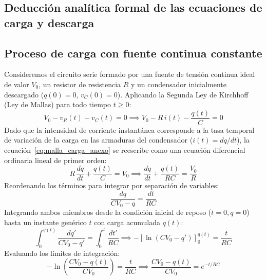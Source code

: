 
\begin{appendices}

\section{Deducción analítica formal de las ecuaciones de carga y descarga}
\label{sec:anexo_deducciones}

\subsection{Proceso de carga con fuente continua constante}

Consideremos el circuito serie formado por una fuente de tensión continua ideal de valor $V_0$, un resistor de resistencia $R$ y un condensador inicialmente descargado ($q(0) = 0$, $v_C(0) = 0$). Aplicando la Segunda Ley de Kirchhoff (Ley de Mallas) para todo tiempo $t \ge 0$:
\begin{equation}
    V_0 - v_R(t) - v_C(t) = 0 \implies V_0 - R\,i(t) - \frac{q(t)}{C} = 0
    \label{eq:malla_carga_anexo}
\end{equation}
Dado que la intensidad de corriente instantánea corresponde a la tasa temporal de variación de la carga en las armaduras del condensador ($i(t) = dq/dt$), la ecuación~\eqref{eq:malla_carga_anexo} se reescribe como una ecuación diferencial ordinaria lineal de primer orden:
\begin{equation}
    R\,\frac{dq}{dt} + \frac{q(t)}{C} = V_0 \implies \frac{dq}{dt} + \frac{q(t)}{RC} = \frac{V_0}{R}
\end{equation}
Reordenando los términos para integrar por separación de variables:
\begin{equation}
    \frac{dq}{C V_0 - q} = \frac{dt}{RC}
\end{equation}
Integrando ambos miembros desde la condición inicial de reposo ($t = 0, q = 0$) hasta un instante genérico $t$ con carga acumulada $q(t)$:
\begin{equation}
    \int_{0}^{q(t)} \frac{dq'}{C V_0 - q'} = \int_{0}^{t} \frac{dt'}{RC} \implies -\left[ \ln(C V_0 - q') \right]_{0}^{q(t)} = \frac{t}{RC}
\end{equation}
Evaluando los límites de integración:
\begin{equation}
    -\ln\left(\frac{C V_0 - q(t)}{C V_0}\right) = \frac{t}{RC} \implies \frac{C V_0 - q(t)}{C V_0} = e^{-t / RC}

\end{equation}
\end{appendices}
